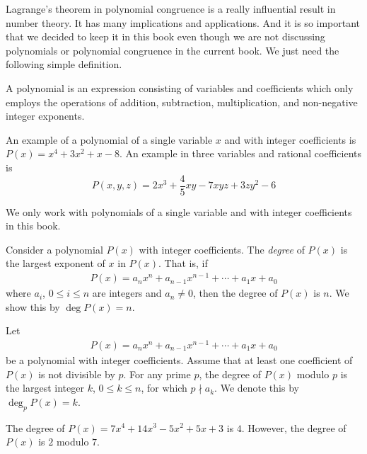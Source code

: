 \documentclass[12pt]{subfile}
\begin{document}
	Lagrange's theorem in polynomial congruence is a really influential result in number theory. It has many implications and applications. And it is so important that we decided to keep it in this book even though we are not discussing polynomials or polynomial congruence in the current book. We just need the following simple definition.

		\begin{definition}
			A polynomial is an expression consisting of variables and coefficients which only employs the operations of addition, subtraction, multiplication, and non-negative integer exponents.
		\end{definition}

		\begin{example}
			An example of a polynomial of a single variable $x$ and with integer coefficients is $P(x)=x^4+3x^2 + x -8$. An example in three variables and rational coefficients is
				$$P(x,y,z)=2x^3 + \dfrac{4}{5}xy- 7xyz + 3zy^2 - 6$$
		\end{example}

		\begin{note}
			We only work with polynomials of a single variable and with integer coefficients in this book.
		\end{note}

		\begin{definition}
			Consider a polynomial $P(x)$ with integer coefficients. The \textit{degree} of $P(x)$ is the largest exponent of $x$ in $P(x)$. That is, if
				\begin{align*}
					P(x)=a_nx^n + a_{n-1}x^{n-1} + \cdots + a_1 x +a_0
				\end{align*}
			 where $a_i$, $0 \leq i \leq n$ are integers and $a_n \neq 0$, then the degree of $P(x)$ is $n$. We show this by $\deg P(x)=n$.
		\end{definition}

		\begin{definition}
			Let
				\begin{align*}
					P(x)=a_nx^n + a_{n-1}x^{n-1} + \cdots + a_1 x +a_0
				\end{align*}
			be a polynomial with integer coefficients. Assume that at least one coefficient of $P(x)$ is not divisible by $p$. For any prime $p$, the degree of $P(x)$ modulo $p$ is the largest integer $k$, $0 \leq k \leq n$,  for which $p \nmid a_k$. We denote this by $\deg_p P(x)=k$.
		\end{definition}

		\begin{example}
			The degree of $P(x)=7x^4 + 14x^3 - 5x^2 + 5x + 3$ is $4$. However, the degree of $P(x)$ is $2$ modulo $7$.
		\end{example}
\end{document}
